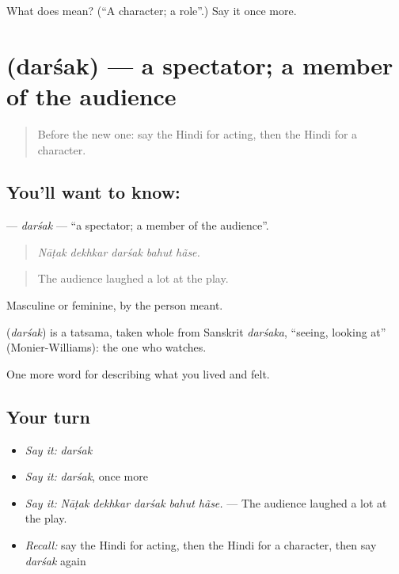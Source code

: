 \begin{tcolorbox}[breakable,colback=teal!4,colframe=teal!35!black,title={Before you move on}]
What does  mean? (\textquotedblleft{}A character; a role\textquotedblright{}.) Say it once more.
\end{tcolorbox}
\section[\texorpdfstring{\hi{दर्शक} (darśak)}{दर्शक (darśak)}]{ (darśak) — a spectator; a member of the audience}

\label{lesson:HI-C529-darsak}



\begin{quote}
Before the new one: say the Hindi for acting, then the Hindi for a character.
\end{quote}

\subsection*{You'll want to know: }
\textbf{} — \emph{darśak} — \textquotedblleft{}a spectator; a member of the audience\textquotedblright{}.

\begin{quote}
    
\end{quote}

\begin{quote}
\emph{Nāṭak dekhkar darśak bahut hãse.}
\end{quote}

\begin{quote}
The audience laughed a lot at the play.
\end{quote}

Masculine or feminine, by the person meant.

\begin{cousinweb}
\textbf{} (\emph{darśak}) is a tatsama, taken whole from Sanskrit \emph{darśaka}, \textquotedblleft{}seeing, looking at\textquotedblright{} (Monier-Williams): the one who watches.
\end{cousinweb}

\begin{grammarlens}[title={What you've built}]
One more word for describing what you lived and felt.
\end{grammarlens}

\subsection*{Your turn}
\begin{itemize}
\raggedright
  \item \emph{Say it:} \emph{darśak}
  \item \emph{Say it:} \emph{darśak}, once more
  \item \emph{Say it:} \emph{Nāṭak dekhkar darśak bahut hãse.} — The audience laughed a lot at the play.
  \item \emph{Recall:} say the Hindi for acting, then the Hindi for a character, then say \emph{darśak} again
\end{itemize}

